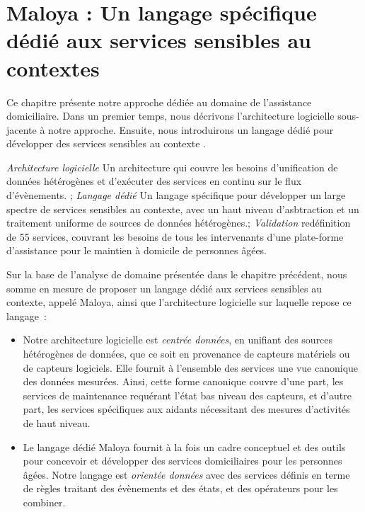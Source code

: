 \chapter{Maloya : Un langage spécifique dédié aux services sensibles au contextes}\label{sec:dsl}
\begin{preamble}
Ce chapitre présente notre approche dédiée au domaine de l'assistance domiciliaire. Dans un premier
temps, nous décrivons l'architecture logicielle sous-jacente à notre approche. Ensuite, nous
introduirons un langage dédié pour développer des services sensibles au contexte
. 
\end{preamble}
{
{\em Architecture logicielle} Un architecture qui couvre les besoins d'unification de données hétérogènes et d'exécuter des services en continu sur le flux d'évènements. ;
{\em Langage dédié} Un langage spécifique pour développer un large spectre de services sensibles au contexte, avec un haut niveau d'asbtraction et un traitement uniforme de sources de données hétérogènes.;
{\em Validation} redéfinition de 55 services, couvrant les besoins de tous les intervenants d'une plate-forme d'assistance pour le maintien à domicile de personnes âgées.
}

Sur la base de l'analyse de domaine présentée dans le chapitre précédent, 
nous somme en mesure de proposer un langage dédié aux services sensibles au 
contexte, appelé Maloya, ainsi que l'architecture logicielle sur
laquelle repose ce langage~:
\begin{itemize}
\item Notre architecture logicielle  est {\em centrée données}, en unifiant des sources 
hétérogènes de données, que ce soit en provenance de capteurs matériels ou de capteurs logiciels.
Elle fournit à l'ensemble des services une vue canonique des données mesurées. Ainsi, cette
forme canonique couvre d'une part, les
services de maintenance requérant l'état bas niveau des capteurs, et d'autre part, 
les services spécifiques aux aidants nécessitant des mesures d'activités de haut 
niveau. 
\item Le langage dédié Maloya fournit à la fois un cadre 
conceptuel et des outils pour concevoir et développer des services domiciliaires 
pour les personnes âgées. Notre langage est {\em orientée données} avec des services définis en 
terme de règles traitant des évènements et des états, et des opérateurs pour les combiner. 
\end{itemize}

